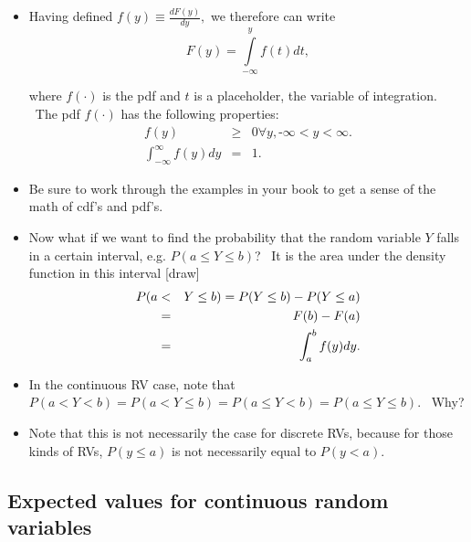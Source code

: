 \documentclass[11pt]{article}
\begin{document}
\begin{itemize}
\item Having defined $f(y)\equiv \frac{dF(y)}{dy},$ we therefore can write%
\begin{equation*}
F(y)=\int\limits_{-\infty }^{y}f(t)dt,
\end{equation*}

where $f(\cdot )$ is the pdf and $t$ is a placeholder, the variable of
integration. \ The pdf $f(\cdot )$ has the following properties:%
\begin{eqnarray*}
f(y) &\geq &0\forall y,\text{-}\infty <y<\infty . \\
\int_{-\infty }^{\infty }f(y)dy &=&1.
\end{eqnarray*}

\item Be sure to work through the examples in your book to get a sense of
the math of cdf's and pdf's.

\item Now what if we want to find the probability that the random variable $Y
$ falls in a certain interval, e.g. $P(a\leq Y\leq b)$? \ It is the area
under the density function in this interval [draw]%
\begin{eqnarray}
P(a &<&Y\leq b)=P(Y\leq b)-P(Y\leq a)  \notag \\
&=&F(b)-F(a)  \notag \\
&=&\int_{a}^{b}f(y)dy.
\end{eqnarray}

\item In the continuous RV case, note that $P(a<Y<b)=P(a<Y\leq b)=P(a\leq
Y<b)=P(a\leq Y\leq b).$ \ Why?

\item Note that this is not necessarily the case for discrete RVs, because
for those kinds of RVs, $P(y\leq a)$ is not necessarily equal to $P(y<a).$
\end{itemize}

\subsection{Expected values for continuous random variables}
\end{document}
